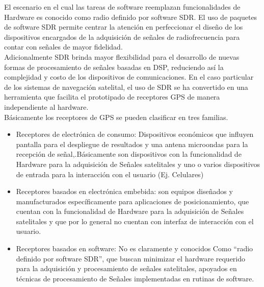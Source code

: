 El escenario en el cual las tareas de software reemplazan funcionalidades de Hardware es conocido como radio definido por software SDR. El uso de paquetes de software SDR permite centrar la atención en perfeccionar el diseño de los dispositivos encargados de la adquisición de señales de radiofrecuencia para contar con señales de mayor fidelidad.\\

Adicionalmente SDR brinda mayor flexibilidad para el desarrollo de nuevas formas de procesamiento de señales basadas en DSP, reduciendo así la complejidad y costo de los dispositivos de comunicaciones. En el caso particular de los sistemas de navegación satelital, el uso de SDR se ha convertido en una herramienta que facilita el prototipado de receptores GPS de manera independiente al hardware.\\

Básicamente los receptores de GPS se pueden clasificar en tres familias.

\begin{itemize}

\item Receptores de electrónica de consumo: Dispositivos económicos que influyen pantalla para el despliegue de resultados y una antena microondas para la recepción de señal,.Básicamente son dispositivos con la funcionalidad de Hardware para la adquisición de Señales satelitales y uno o varios dispositivos de entrada para la  interacción con el usuario (Ej. Celulares)

\item Receptores basados en electrónica embebida: son equipos diseñados y manufacturados específicamente para aplicaciones de posicionamiento, que cuentan con la funcionalidad de Hardware para la adquisición de Señales satelitales y que por lo general no cuentan con interfaz de interacción con el usuario.

\item Receptores basados en software: No es claramente y conocidos Como “radio definido por software SDR”, que buscan minimizar el hardware requerido para la adquisición y procesamiento de señales satelitales, apoyados en técnicas de procesamiento de Señales implementadas en rutinas de software.

\end{itemize}
